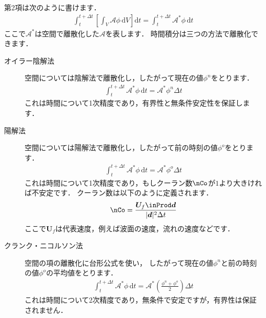 第2項は次のように書けます．
\begin{align}
 \label{eq:2.32}
 \int_{t}^{t + \Delta t}\left[\int_{V}\mathcal{A}\phi\,\mathrm{d}V\right]\mathrm{d}t
 = \int_{t}^{t + \Delta t}\mathcal{A}^{*}\phi\,\mathrm{d}t
\end{align}
ここで$\mathcal{A}^{*}$は空間で離散化した$\mathcal{A}$を表します．
時間積分は三つの方法で離散化できます．
\begin{description}
 \item[オイラー陰解法] 空間については陰解法で離散化し，したがって現在の値$\phi^{n}$をとります．
            \begin{align}
             \label{eq:2.33}
             \int_{t}^{t + \Delta t}\mathcal{A}^{*}\phi\,\mathrm{d}t
             = \mathcal{A}^{*}\phi^{n}\Delta t
            \end{align}
            これは時間について1次精度であり，有界性と無条件安定性を保証します．
 \item[陽解法] 空間については陽解法で離散化し，したがって前の時刻の値$\phi^{o}$をとります．
            \begin{align}
             \label{eq:2.34}
             \int_{t}^{t + \Delta t}\mathcal{A}^{*}\phi\,\mathrm{d}t
             = \mathcal{A}^{*}\phi^{o}\Delta t
            \end{align}
            これは時間について1次精度であり，もしクーラン数$\nCo$が$1$より大きければ不安定です．
            クーラン数は以下のように定義されます．
            \begin{align}
             \label{eq:2.35}
             \nCo = \frac{\bm{U}_{f} \inProd \bm{d}}{|\bm{d}|^{2}\Delta t}
            \end{align}
            ここで$\bm{U}_{f}$は代表速度，例えば波面の速度，流れの速度などです．
 \item[クランク・ニコルソン法] 空間の項の離散化に台形公式を使い，
            したがって現在の値$\phi^{n}$と前の時刻の値$\phi^{o}$の平均値をとります．
            \begin{align}
             \label{eq:2.36}
             \int_{t}^{t + \Delta t}\mathcal{A}^{*}\phi\,\mathrm{d}t
             = \mathcal{A}^{*}\left(\frac{\phi^{n} + \phi^{o}}{2}\right)\Delta t
            \end{align}
            これは時間について2次精度であり，無条件で安定ですが，有界性は保証されません．
\end{description}


